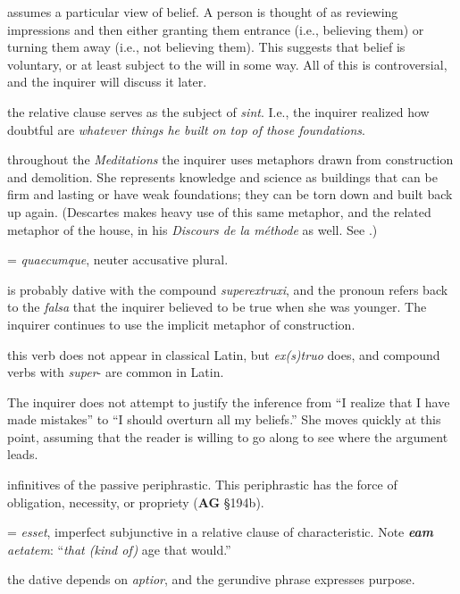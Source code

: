  assumes a particular view of belief. A person is thought of as reviewing impressions and then either granting them entrance (i.e., believing them) or turning them away (i.e., not believing them). This suggests that belief is voluntary, or at least subject to the will in some way. All of this is controversial, and the inquirer will discuss it later.

 the relative clause serves as the subject of \textit{sint}. I.e., the inquirer realized how doubtful are \textit{whatever things he built on top of those foundations}.

 throughout the \textit{Meditations} the inquirer uses metaphors drawn from construction and demolition. She represents knowledge and science as buildings that can be firm and lasting or have weak foundations; they can be torn down and built back up again. (Descartes makes heavy use of this same metaphor, and the related metaphor of the house, in his \textit{Discours de la méthode} as well. See \cite[22]{curtis1984}.)

 = \textit{quaecumque}, neuter accusative plural.

 is probably dative with the compound \textit{superextruxi}, and the pronoun refers back to the \textit{falsa} that the inquirer believed to be true when she was younger. The inquirer continues to use the implicit metaphor of construction.

 this verb does not appear in classical Latin, but \textit{ex(s)truo} does, and compound verbs with \textit{super}- are common in Latin.

 The inquirer does not attempt to justify the inference from ``I realize that I have made mistakes'' to ``I should overturn all my beliefs.'' She moves quickly at this point, assuming that the reader is willing to go along to see where the argument leads. 

 infinitives of the passive periphrastic. This periphrastic has the force of obligation, necessity, or propriety (\textbf{AG} §194b).

 = \textit{esset}, imperfect subjunctive in a relative clause of characteristic. Note \textit{\textbf{eam} aetatem}: ``\textit{that (kind of)} age that would.''

 the dative depends on \textit{aptior}, and the gerundive phrase expresses purpose.

